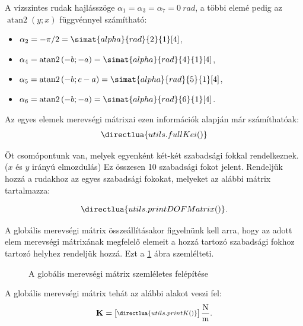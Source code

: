 \documentclass[a4paper, 12pt]{scrartcl}
\newcommand{\rmat}[1]{\mathbf{#1}}
\DeclareMathOperator\atann{atan2}
\begin{document}
A vízszintes rudak hajlásszöge $\alpha_1 = \alpha_3 = \alpha_7 = \SI{0}{rad}$,
a többi elemé pedig az $\atann(y; x)$ függvénnyel számítható:
\begin{multicols}{2}
  \begin{itemize}
    \item $\a_2 = -\pi/2 = \simat{alpha}{rad}{2}{1}[4]$,
    \item $\a_4 = \atann \left( -b; -a \right) = \simat{alpha}{rad}{4}{1}[4]$,
    \item $\a_5 = \atann \left( -b; c-a \right) = \simat{alpha}{rad}{5}{1}[4]$,
    \item $\a_6 = \atann \left( -b; -a \right) = \simat{alpha}{rad}{6}{1}[4]$.
  \end{itemize}
\end{multicols}

Az egyes elemek merevségi mátrixai ezen információk alapján már számíthatóak:
\begin{equation}
  \begin{split}
    \directlua{utils.fullKei()}
  \end{split}
\end{equation}

Öt csomópontunk van, melyek egyenként két-két szabadsági fokkal rendelkeznek.
($x$ és $y$ irányú elmozdulás) Ez összesen 10 szabadsági fokot jelent.
Rendeljük hozzá a rudakhoz az egyes szabadsági fokokat, melyeket az alábbi
mátrix tartalmazza:

\begin{equation}
  \directlua{utils.printDOFMatrix()}
  .
  \label{eq:DOF}
\end{equation}

A globális merevségi mátrix összeállításakor figyelnünk kell arra, hogy az adott
elem merevségi mátrixának megfelelő elemeit a hozzá tartozó szabadsági fokhoz
tartozó helyhez rendeljük hozzá. Ezt a \ref{fig:table} ábra szemlélteti.
\begin{figure}[H]
  \centering
  
  \caption{A globális merevségi mátrix szemléletes felépítése}
  \label{fig:table}
\end{figure}

A globális merevségi mátrix tehát az alábbi alakot veszi fel:
\begin{equation}
  \scriptsize{
    \rmat K = \begin{bmatrix}
      \directlua{utils.printK()}
    \end{bmatrix} \mathrm{\frac{N}{m}}
  }.
  \label{eq:K}
\end{equation}
\end{document}
